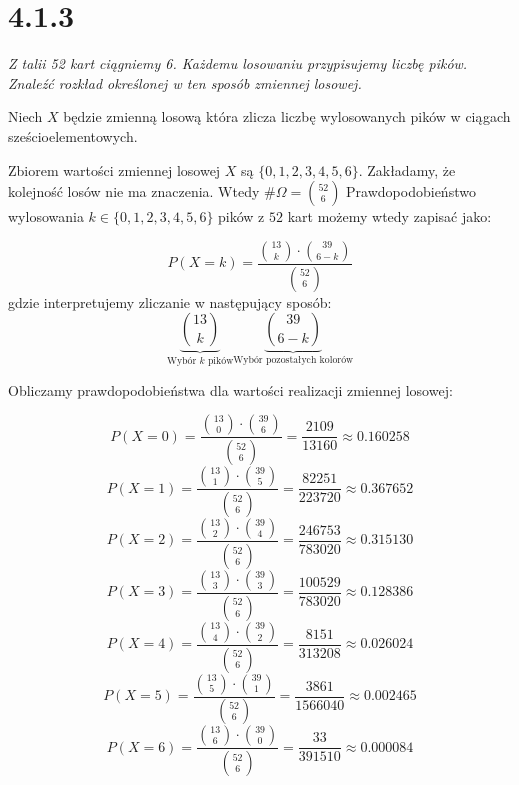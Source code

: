 \documentclass{article}
\begin{document}
\section*{4.1.3}

\begin{center}
    \emph{Z talii 52 kart ciągniemy 6. Każdemu losowaniu przypisujemy liczbę pików. Znaleźć rozkład określonej w ten sposób
zmiennej losowej.}
\end{center}

Niech \(X\) będzie zmienną losową która zlicza liczbę wylosowanych pików w ciągach sześcioelementowych.
\par Zbiorem wartości zmiennej losowej \(X\) są \(\{0, 1, 2, 3, 4, 5, 6\}\). Zakładamy, że kolejność losów nie ma znaczenia.
Wtedy \(\# \Omega = {\binom{52}{6}}\)
Prawdopodobieństwo wylosowania \(k \in \{0, 1, 2, 3, 4, 5, 6\}\) pików z \(52\) kart możemy wtedy zapisać jako:

\begin{equation*}
    P(X = k) = \frac{\binom{13}{k} \cdot \binom{39}{6 - k}}{\binom{52}{6}}
\end{equation*}
gdzie interpretujemy zliczanie w następujący sposób:
\begin{equation*}
    \underbrace{\binom{13}{k}}_\text{Wybór \(k\) pików} \underbrace{\binom{39}{6 - k}}_\text{Wybór pozostałych kolorów}
\end{equation*}

Obliczamy prawdopodobieństwa dla wartości realizacji zmiennej losowej:

\begin{equation*}
    P(X = 0) = \frac{\binom{13}{0} \cdot \binom{39}{6}}{\binom{52}{6}} = \frac{2109}{13160} \approx 0.160258
\end{equation*}
\begin{equation*}
    P(X = 1) = \frac{\binom{13}{1} \cdot \binom{39}{5}}{\binom{52}{6}} = \frac{82251}{223720} \approx 0.367652
\end{equation*}
\begin{equation*}
    P(X = 2) = \frac{\binom{13}{2} \cdot \binom{39}{4}}{\binom{52}{6}} = \frac{246753}{783020} \approx 0.315130
\end{equation*}
\begin{equation*}
    P(X = 3) = \frac{\binom{13}{3} \cdot \binom{39}{3}}{\binom{52}{6}} = \frac{100529}{783020} \approx 0.128386
\end{equation*}
\begin{equation*}
    P(X = 4) = \frac{\binom{13}{4} \cdot \binom{39}{2}}{\binom{52}{6}} = \frac{8151}{313208} \approx 0.026024
\end{equation*}
\begin{equation*}
    P(X = 5) = \frac{\binom{13}{5} \cdot \binom{39}{1}}{\binom{52}{6}} = \frac{3861}{1566040} \approx 0.002465
\end{equation*}
\begin{equation*}
    P(X = 6) = \frac{\binom{13}{6} \cdot \binom{39}{0}}{\binom{52}{6}} = \frac{33}{391510} \approx 0.000084
\end{equation*}
\end{document}
